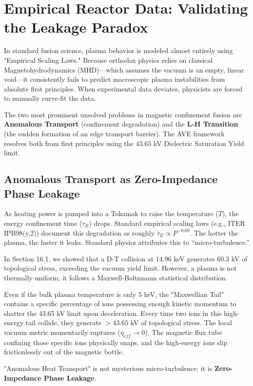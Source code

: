 \section{Empirical Reactor Data: Validating the Leakage Paradox}

In standard fusion science, plasma behavior is modeled almost entirely using "Empirical Scaling Laws." Because orthodox physics relies on classical Magnetohydrodynamics (MHD)---which assumes the vacuum is an empty, linear void---it consistently fails to predict macroscopic plasma instabilities from absolute first principles. When experimental data deviates, physicists are forced to manually curve-fit the data. 

The two most prominent unsolved problems in magnetic confinement fusion are \textbf{Anomalous Transport} (confinement degradation) and the \textbf{L-H Transition} (the sudden formation of an edge transport barrier). The AVE framework resolves both from first principles using the $43.65$ kV Dielectric Saturation Yield limit.

\subsection{Anomalous Transport as Zero-Impedance Phase Leakage}
As heating power is pumped into a Tokamak to raise the temperature ($T$), the energy confinement time ($\tau_E$) drops. Standard empirical scaling laws (e.g., ITER IPB98(y,2)) document this degradation as roughly $\tau_E \propto P^{-0.69}$. The hotter the plasma, the faster it leaks. Standard physics attributes this to ``micro-turbulence.''

In Section 16.1, we showed that a D-T collision at $14.96$ keV generates $60.3$ kV of topological stress, exceeding the vacuum yield limit. However, a plasma is not thermally uniform; it follows a Maxwell-Boltzmann statistical distribution. 

Even if the bulk plasma temperature is only $5$ keV, the "Maxwellian Tail" contains a specific percentage of ions possessing enough kinetic momentum to shatter the 43.65 kV limit upon deceleration. Every time two ions in this high-energy tail collide, they generate $>43.65$ kV of topological stress. The local vacuum metric momentarily ruptures ($\eta_{eff} \to 0$). The magnetic flux tube confining those specific ions physically snaps, and the high-energy ions slip frictionlessly out of the magnetic bottle.

"Anomalous Heat Transport" is not mysterious micro-turbulence; it is \textbf{Zero-Impedance Phase Leakage}. 

